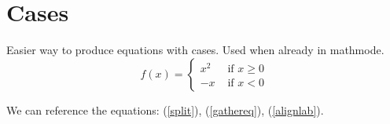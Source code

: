\section[Cases]{Cases}

Easier way to produce equations with cases. Used when already in mathmode. 
\begin{equation*}
f(x) = \begin{cases} x^2 & \text{ if } x\geq0\\
-x & \text{ if } x<0 \end{cases}
\end{equation*}

We can reference the equations: (\ref{split}), (\ref{gathereq}), (\ref{alignlab}). 


